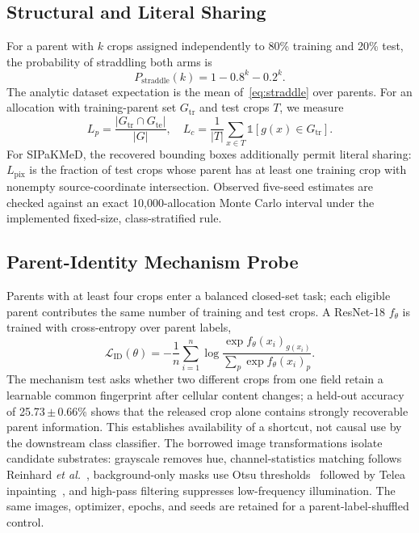 \documentclass[conference]{IEEEtran}
\newcommand{\meanpm}[2]{#1\,$\pm$\,#2}
\begin{document}
\subsection{Structural and Literal Sharing}
For a parent with $k$ crops assigned independently to 80\% training and 20\% test, the probability of straddling both arms is
\begin{equation}
P_{\mathrm{straddle}}(k)=1-0.8^k-0.2^k.
\label{eq:straddle}
\end{equation}
The analytic dataset expectation is the mean of~\eqref{eq:straddle} over parents.
For an allocation with training-parent set $G_{\mathrm{tr}}$ and test crops $T$, we measure
\begin{equation}
L_{p}=\frac{|G_{\mathrm{tr}}\cap G_{\mathrm{te}}|}{|G|},\quad
L_{c}=\frac{1}{|T|}\sum_{x\in T}\mathbb{1}[g(x)\in G_{\mathrm{tr}}].
\label{eq:leakage}
\end{equation}
For SIPaKMeD, the recovered bounding boxes additionally permit literal sharing: $L_{\mathrm{pix}}$ is the fraction of test crops whose parent has at least one training crop with nonempty source-coordinate intersection.
Observed five-seed estimates are checked against an exact 10,000-allocation Monte Carlo interval under the implemented fixed-size, class-stratified rule.

\subsection{Parent-Identity Mechanism Probe}
Parents with at least four crops enter a balanced closed-set task; each eligible parent contributes the same number of training and test crops.
A ResNet-18 $f_\theta$ is trained with cross-entropy over parent labels,
\begin{equation}
\mathcal{L}_{\mathrm{ID}}(\theta)=-\frac{1}{n}\sum_{i=1}^{n}
\log \frac{\exp f_\theta(x_i)_{g(x_i)}}{\sum_{p}\exp f_\theta(x_i)_p}.
\label{eq:probe}
\end{equation}
The mechanism test asks whether two different crops from one field retain a learnable common fingerprint after cellular content changes; a held-out accuracy of \meanpm{25.73}{0.66}\% shows that the released crop alone contains strongly recoverable parent information.
This establishes availability of a shortcut, not causal use by the downstream class classifier.
The borrowed image transformations isolate candidate substrates: grayscale removes hue, channel-statistics matching follows Reinhard \emph{et al.}~\cite{reinhard2001color}, background-only masks use Otsu thresholds~\cite{otsu1979threshold} followed by Telea inpainting~\cite{telea2004inpainting}, and high-pass filtering suppresses low-frequency illumination.
The same images, optimizer, epochs, and seeds are retained for a parent-label-shuffled control.
\end{document}
